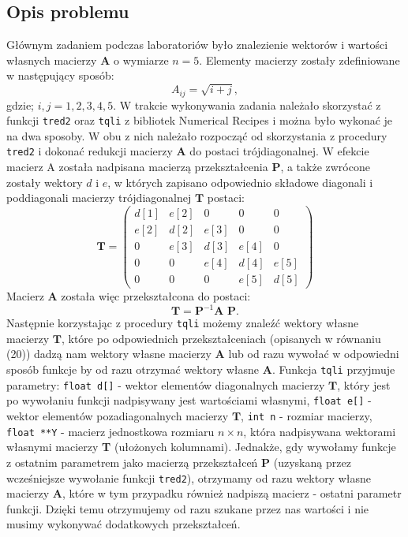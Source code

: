 \documentclass{article}
\begin{document}
\subsection{Opis problemu}
Głównym zadaniem podczas laboratoriów było znalezienie wektorów i wartości własnych macierzy $\textbf{A}$ o \nolinebreak wymiarze $n = 5$. Elementy macierzy zostały zdefiniowane w następujący sposób:
\begin{equation}
A_{ij} = \sqrt{i+j},
\end{equation}
gdzie; $i,j = 1,2,3,4,5$. W trakcie wykonywania zadania należało skorzystać z funkcji \texttt{tred2} oraz \texttt{tqli} z \nolinebreak bibliotek Numerical Recipes i można było wykonać je na dwa sposoby. W obu z nich należało rozpocząć od skorzystania z procedury \texttt{tred2} i dokonać redukcji macierzy $\textbf{A}$ do postaci trójdiagonalnej. W efekcie macierz A została nadpisana macierzą przekształcenia \textbf{P}, a także zwrócone zostały wektory $d$ i $e$, w \nolinebreak których zapisano odpowiednio składowe diagonali i poddiagonali macierzy trójdiagonalnej $\textbf{T}$ postaci:
\begin{equation}
	\textbf{T} = 
	\begin{pmatrix}
	d[1] & e[2] & 0 & 0 & 0 \\
	e[2] & d[2] & e[3] & 0 & 0 \\
	0 & e[3] & d[3] & e[4] & 0 \\
	0 & 0 & e[4] & d[4] & e[5] \\
	0 & 0 & 0 & e[5] & d[5]
	\end{pmatrix}
\end{equation}
Macierz $\textbf{A}$ została więc przekształcona do postaci:
\begin{equation}
\textbf{T} = \textbf{P}^{-1} \textbf{A P}.
\end{equation}
Następnie korzystając z procedury \texttt{tqli} możemy znaleźć wektory własne macierzy $\textbf{T}$, które po odpowiednich przekształceniach (opisanych w równaniu (20)) dadzą nam wektory własne macierzy $\textbf{A}$ lub od razu wywołać w odpowiedni sposób funkcje by od razu otrzymać wektory własne $\textbf{A}$.  Funkcja \texttt{tqli} przyjmuje parametry: \texttt{float d[]} - wektor elementów diagonalnych macierzy $\textbf{T}$, który jest po wywołaniu funkcji nadpisywany jest wartościami własnymi, \texttt{float e[]} - wektor elementów pozadiagonalnych macierzy $\textbf{T}$, \texttt{int n} - rozmiar macierzy,  \texttt{float **Y} - macierz jednostkowa rozmiaru $n \times n$, która nadpisywana wektorami własnymi macierzy \textbf{T} (ułożonych kolumnami). Jednakże, gdy wywołamy funkcje z ostatnim parametrem jako macierzą przekształceń $\textbf{P}$ (uzyskaną przez wcześniejsze wywołanie funkcji \texttt{tred2}), otrzymamy od razu wektory własne macierzy $\textbf{A}$, które w tym przypadku również nadpiszą macierz - ostatni parametr funkcji. Dzięki temu otrzymujemy od razu szukane przez nas wartości i nie musimy wykonywać dodatkowych przekształceń. 
\end{document}
